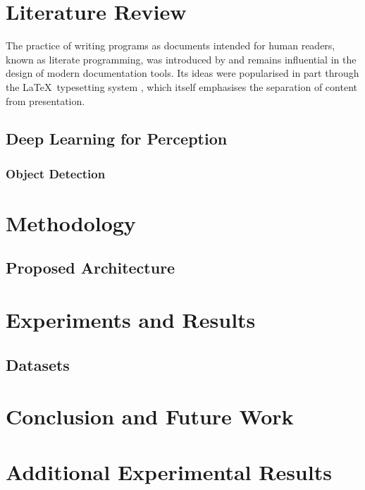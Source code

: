 \documentclass{umphdthesis}
\begin{document}
\lipsum[1-2]

\chapter{Literature Review}

The practice of writing programs as documents intended for human
readers, known as literate programming, was introduced by
\cite{knuth1984} and remains influential in the design of modern
documentation tools. Its ideas were popularised in part through the
\LaTeX\ typesetting system \cite{lamport1994}, which itself emphasises
the separation of content from presentation.

\section{Deep Learning for Perception}
\subsection{Object Detection}
\lipsum[1-2]

\chapter{Methodology}
\section{Proposed Architecture}
\lipsum[1-2]

\chapter{Experiments and Results}
\section{Datasets}
\lipsum[1-2]

\chapter{Conclusion and Future Work}
\lipsum[1-2]



\clearpage

\appendix
\chapter{Additional Experimental Results}

\lipsum[1-2]
\end{document}
